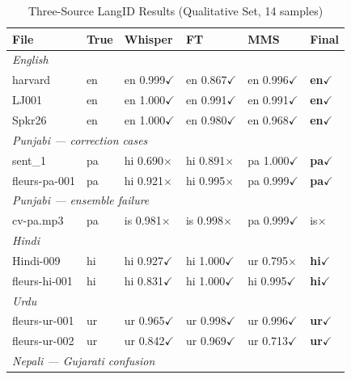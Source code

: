 \documentclass[12pt, onecolumn]{IEEEtran}
\begin{document}
\begin{table}[htbp]
\caption{Three-Source LangID Results (Qualitative Set, 14 samples)}
\label{tab:langid}
\begin{center}
\small
\begin{tabular}{p{2.0cm}lp{2.0cm}p{1.6cm}p{1.6cm}l}
\toprule
\textbf{File} & \textbf{True} & \textbf{Whisper} & \textbf{FT} & \textbf{MMS} & \textbf{Final} \\
\midrule
\multicolumn{6}{l}{\footnotesize\textit{English}} \\
harvard        & en & en 0.999$\checkmark$ & en 0.867$\checkmark$ & en 0.996$\checkmark$ & \textbf{en}$\checkmark$ \\
LJ001          & en & en 1.000$\checkmark$ & en 0.991$\checkmark$ & en 0.991$\checkmark$ & \textbf{en}$\checkmark$ \\
Spkr26         & en & en 1.000$\checkmark$ & en 0.980$\checkmark$ & en 0.968$\checkmark$ & \textbf{en}$\checkmark$ \\
\midrule
\multicolumn{6}{l}{\footnotesize\textit{Punjabi --- correction cases}} \\
sent\_1        & pa & hi 0.690$\times$ & hi 0.891$\times$ & pa 1.000$\checkmark$ & \textbf{pa}$\checkmark$ \\
fleurs-pa-001  & pa & hi 0.921$\times$ & hi 0.995$\times$ & pa 0.999$\checkmark$ & \textbf{pa}$\checkmark$ \\
\multicolumn{6}{l}{\footnotesize\textit{Punjabi --- ensemble failure}} \\
cv-pa.mp3      & pa & is 0.981$\times$ & is 0.998$\times$ & pa 0.999$\checkmark$ & is$\times$ \\
\midrule
\multicolumn{6}{l}{\footnotesize\textit{Hindi}} \\
Hindi-009      & hi & hi 0.927$\checkmark$ & hi 1.000$\checkmark$ & ur 0.795$\times$ & \textbf{hi}$\checkmark$ \\
fleurs-hi-001  & hi & hi 0.831$\checkmark$ & hi 1.000$\checkmark$ & hi 0.995$\checkmark$ & \textbf{hi}$\checkmark$ \\
\midrule
\multicolumn{6}{l}{\footnotesize\textit{Urdu}} \\
fleurs-ur-001  & ur & ur 0.965$\checkmark$ & ur 0.998$\checkmark$ & ur 0.996$\checkmark$ & \textbf{ur}$\checkmark$ \\
fleurs-ur-002  & ur & ur 0.842$\checkmark$ & ur 0.969$\checkmark$ & ur 0.713$\checkmark$ & \textbf{ur}$\checkmark$ \\
\midrule
\multicolumn{6}{l}{\footnotesize\textit{Nepali --- Gujarati confusion}} \\

\end{tabular}
\end{center}
\end{table}
\end{document}
